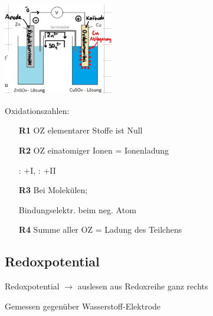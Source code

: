     \begin{minipage}{0.5\linewidth}
        \includegraphics[height=4cm]{pictures/Galv.png}
    \end{minipage}
    \hfill
    \begin{minipage}{0.5\linewidth}
        Oxidationszahlen:
        \begin{itemize}
            \item[\textbf{R1}] OZ elementarer Stoffe ist Null
            \item[]            
            \item[\textbf{R2}] OZ einatomiger Ionen = Ionenladung
            \item[]             : +I,  : +II
            \item[\textbf{R3}] Bei Molekülen;
            \item[]            Bindungselektr. beim neg. Atom
            \item[\textbf{R4}] Summe aller OZ = Ladung des Teilchens
        \end{itemize}
    \end{minipage}
\subsection{Redoxpotential}
    Redoxpotential $\to$ auslesen aus Redoxreihe ganz rechts 
    
    Gemessen gegenüber Wasserstoff-Elektrode

